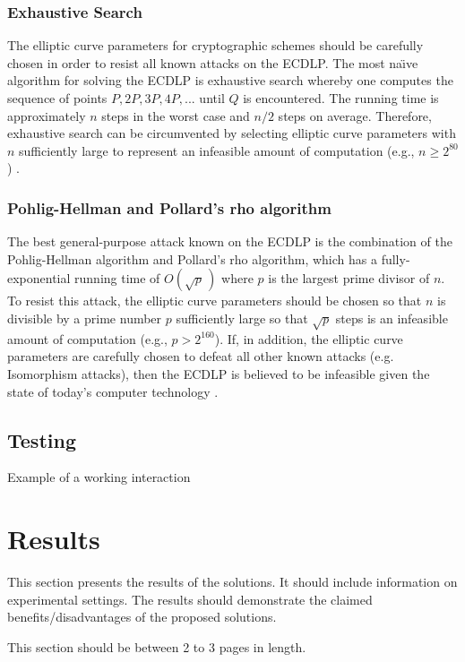 \documentclass[12pt,a4paper]{article}
\begin{document}
\subsubsection{Exhaustive Search} \label{Exhaustive Search}
The elliptic curve parameters for cryptographic schemes should be carefully chosen in order to resist all known attacks on the ECDLP. 
The most na\"{\i}ve algorithm for solving the ECDLP is exhaustive search whereby one computes the sequence of points $P,2P,3P,4P,...$ until $Q$ is encountered. 
The running time is approximately $n$ steps in the worst case and $n/2$ steps on average. 
Therefore, exhaustive search can be circumvented by selecting elliptic curve parameters with $n$ sufficiently large to represent an infeasible amount of computation (e.g., $n \geq 2^{80}$) \cite{hankerson2003guide}.

\subsubsection{Pohlig-Hellman and Pollard's rho algorithm} \label{Pohlig-Hellman and Pollard's rho algorithm}
The best general-purpose attack known on the ECDLP is the combination of the Pohlig-Hellman algorithm and Pollard's rho algorithm, 
which has a fully-exponential running time of $O( \sqrt p \,)$ where $p$ is the largest prime divisor of $n$. 
To resist this attack, the elliptic curve parameters should be chosen so that $n$ is divisible by a prime number $p$ sufficiently large 
so that $\sqrt p$ steps is an infeasible amount of computation (e.g., $p > 2^{160}$).
If, in addition, the elliptic curve parameters are carefully chosen to defeat all other known attacks (e.g. Isomorphism attacks), 
then the ECDLP is believed to be infeasible given the state of today's computer technology \cite{hankerson2003guide}.

\subsection{Testing} \label{Testing}
Example of a working interaction

\section{Results} \label{Results}
This section presents the results of the solutions. 
It should include information on experimental settings. 
The results should demonstrate the claimed benefits/disadvantages of the proposed solutions.

This section should be between 2 to 3 pages in length.
\end{document}
